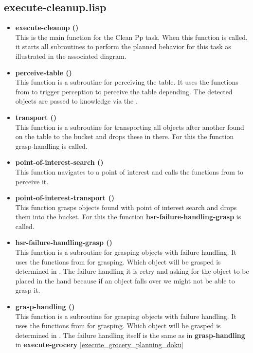\documentclass[main.tex]{subfiles}
\begin{document}
          \subsection{execute-cleanup.lisp}
          \begin{itemize}
            \item \textbf{execute-cleanup ()} \\
            This is the main function for the Clean Pp task. When this function is called, it starts all subroutines to perform the planned behavior for this task as illustrated in the associated diagram.
            \item \textbf{perceive-table ()} \\
            This function is a subroutine for perceiving the table. It uses the functions from  to trigger perception to perceive the table depending. The detected objects are passed to knowledge via the .
            \item \textbf{transport ()} \\
            This function is a subroutine for transporting all objects after another found on the table to the bucket and drops these in there. For this the function grasp-handling is called.
            \item \textbf{point-of-interest-search ()} \\
            This function navigates to a point of interest and calls the functions from  to perceive it. 
            \item \textbf{point-of-interest-transport ()} \\
            This function grasps objects found with point of interest search and drops them into the bucket. For this the function \textbf{hsr-failure-handling-grasp} is called.
            \item \textbf{hsr-failure-handling-grasp ()} \\
            This function is a subroutine for grasping objects with failure handling. It uses the functions from  for grasping. Which object will be grasped is determined in . The failure handling it is retry and asking for the object to be placed in the hand because if an object falls over we might not be  able to grasp it.
            \item \textbf{grasp-handling ()}\\
            This function is a subroutine for grasping objects with failure handling. It uses the functions from  for grasping. Which object will be grasped is determined in . The failure handling itself is the same as in   
\textbf{grasp-handling} in \textbf{execute-grocery} \ref{execute_grocery_planning_doku}
        \end{itemize}
\end{document}
